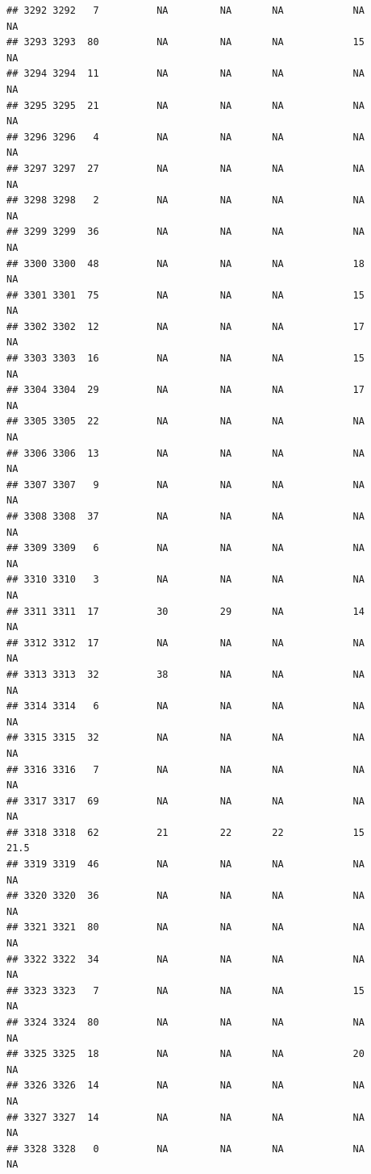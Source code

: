 \documentclass[man]{apa6}
\begin{document}
\begin{verbatim}
## 3292 3292   7          NA         NA       NA            NA       NA
## 3293 3293  80          NA         NA       NA            15       NA
## 3294 3294  11          NA         NA       NA            NA       NA
## 3295 3295  21          NA         NA       NA            NA       NA
## 3296 3296   4          NA         NA       NA            NA       NA
## 3297 3297  27          NA         NA       NA            NA       NA
## 3298 3298   2          NA         NA       NA            NA       NA
## 3299 3299  36          NA         NA       NA            NA       NA
## 3300 3300  48          NA         NA       NA            18       NA
## 3301 3301  75          NA         NA       NA            15       NA
## 3302 3302  12          NA         NA       NA            17       NA
## 3303 3303  16          NA         NA       NA            15       NA
## 3304 3304  29          NA         NA       NA            17       NA
## 3305 3305  22          NA         NA       NA            NA       NA
## 3306 3306  13          NA         NA       NA            NA       NA
## 3307 3307   9          NA         NA       NA            NA       NA
## 3308 3308  37          NA         NA       NA            NA       NA
## 3309 3309   6          NA         NA       NA            NA       NA
## 3310 3310   3          NA         NA       NA            NA       NA
## 3311 3311  17          30         29       NA            14       NA
## 3312 3312  17          NA         NA       NA            NA       NA
## 3313 3313  32          38         NA       NA            NA       NA
## 3314 3314   6          NA         NA       NA            NA       NA
## 3315 3315  32          NA         NA       NA            NA       NA
## 3316 3316   7          NA         NA       NA            NA       NA
## 3317 3317  69          NA         NA       NA            NA       NA
## 3318 3318  62          21         22       22            15     21.5
## 3319 3319  46          NA         NA       NA            NA       NA
## 3320 3320  36          NA         NA       NA            NA       NA
## 3321 3321  80          NA         NA       NA            NA       NA
## 3322 3322  34          NA         NA       NA            NA       NA
## 3323 3323   7          NA         NA       NA            15       NA
## 3324 3324  80          NA         NA       NA            NA       NA
## 3325 3325  18          NA         NA       NA            20       NA
## 3326 3326  14          NA         NA       NA            NA       NA
## 3327 3327  14          NA         NA       NA            NA       NA
## 3328 3328   0          NA         NA       NA            NA       NA

\end{verbatim}
\end{document}
